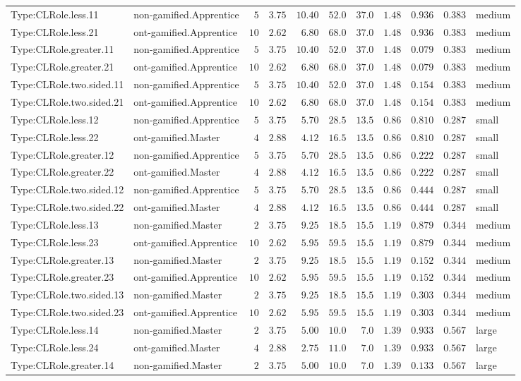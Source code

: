 \documentclass[6pt,a4paper]{article}
\begin{document}
{\begin{longtable}{llrrrrrrrrl}
Type:CLRole.less.11&non-gamified.Apprentice&$ 5$&$3.75$&$10.40$&$ 52.0$&$37.0$&$1.48$&$0.936$&$0.383$&medium\tabularnewline
Type:CLRole.less.21&ont-gamified.Apprentice&$10$&$2.62$&$ 6.80$&$ 68.0$&$37.0$&$1.48$&$0.936$&$0.383$&medium\tabularnewline
Type:CLRole.greater.11&non-gamified.Apprentice&$ 5$&$3.75$&$10.40$&$ 52.0$&$37.0$&$1.48$&$0.079$&$0.383$&medium\tabularnewline
Type:CLRole.greater.21&ont-gamified.Apprentice&$10$&$2.62$&$ 6.80$&$ 68.0$&$37.0$&$1.48$&$0.079$&$0.383$&medium\tabularnewline
Type:CLRole.two.sided.11&non-gamified.Apprentice&$ 5$&$3.75$&$10.40$&$ 52.0$&$37.0$&$1.48$&$0.154$&$0.383$&medium\tabularnewline
Type:CLRole.two.sided.21&ont-gamified.Apprentice&$10$&$2.62$&$ 6.80$&$ 68.0$&$37.0$&$1.48$&$0.154$&$0.383$&medium\tabularnewline
Type:CLRole.less.12&non-gamified.Apprentice&$ 5$&$3.75$&$ 5.70$&$ 28.5$&$13.5$&$0.86$&$0.810$&$0.287$&small\tabularnewline
Type:CLRole.less.22&ont-gamified.Master&$ 4$&$2.88$&$ 4.12$&$ 16.5$&$13.5$&$0.86$&$0.810$&$0.287$&small\tabularnewline
Type:CLRole.greater.12&non-gamified.Apprentice&$ 5$&$3.75$&$ 5.70$&$ 28.5$&$13.5$&$0.86$&$0.222$&$0.287$&small\tabularnewline
Type:CLRole.greater.22&ont-gamified.Master&$ 4$&$2.88$&$ 4.12$&$ 16.5$&$13.5$&$0.86$&$0.222$&$0.287$&small\tabularnewline
Type:CLRole.two.sided.12&non-gamified.Apprentice&$ 5$&$3.75$&$ 5.70$&$ 28.5$&$13.5$&$0.86$&$0.444$&$0.287$&small\tabularnewline
Type:CLRole.two.sided.22&ont-gamified.Master&$ 4$&$2.88$&$ 4.12$&$ 16.5$&$13.5$&$0.86$&$0.444$&$0.287$&small\tabularnewline
Type:CLRole.less.13&non-gamified.Master&$ 2$&$3.75$&$ 9.25$&$ 18.5$&$15.5$&$1.19$&$0.879$&$0.344$&medium\tabularnewline
Type:CLRole.less.23&ont-gamified.Apprentice&$10$&$2.62$&$ 5.95$&$ 59.5$&$15.5$&$1.19$&$0.879$&$0.344$&medium\tabularnewline
Type:CLRole.greater.13&non-gamified.Master&$ 2$&$3.75$&$ 9.25$&$ 18.5$&$15.5$&$1.19$&$0.152$&$0.344$&medium\tabularnewline
Type:CLRole.greater.23&ont-gamified.Apprentice&$10$&$2.62$&$ 5.95$&$ 59.5$&$15.5$&$1.19$&$0.152$&$0.344$&medium\tabularnewline
Type:CLRole.two.sided.13&non-gamified.Master&$ 2$&$3.75$&$ 9.25$&$ 18.5$&$15.5$&$1.19$&$0.303$&$0.344$&medium\tabularnewline
Type:CLRole.two.sided.23&ont-gamified.Apprentice&$10$&$2.62$&$ 5.95$&$ 59.5$&$15.5$&$1.19$&$0.303$&$0.344$&medium\tabularnewline
Type:CLRole.less.14&non-gamified.Master&$ 2$&$3.75$&$ 5.00$&$ 10.0$&$ 7.0$&$1.39$&$0.933$&$0.567$&large\tabularnewline
Type:CLRole.less.24&ont-gamified.Master&$ 4$&$2.88$&$ 2.75$&$ 11.0$&$ 7.0$&$1.39$&$0.933$&$0.567$&large\tabularnewline
Type:CLRole.greater.14&non-gamified.Master&$ 2$&$3.75$&$ 5.00$&$ 10.0$&$ 7.0$&$1.39$&$0.133$&$0.567$&large\tabularnewline

\end{longtable}}
\end{document}
